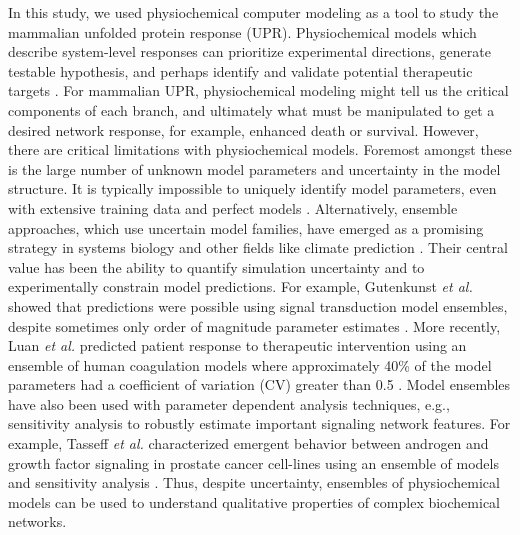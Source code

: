 \documentclass[fleqn,10pt]{wlscirep}
\begin{document}
In this study, we used physiochemical computer modeling as a tool to study the mammalian unfolded protein response (UPR). Physiochemical models which describe system-level responses can prioritize experimental directions, generate testable hypothesis, and perhaps identify and validate potential therapeutic targets \cite{KITANO2007}. For mammalian UPR, physiochemical modeling might tell us the critical components of each branch, and ultimately what must be manipulated to get a desired network response, for example, enhanced death or survival. However, there are critical limitations with physiochemical models. Foremost amongst these is the large number of unknown model parameters and uncertainty in the model structure. It is typically impossible to uniquely identify model parameters, even with extensive training data and perfect models \cite{Gadkar:2005ad}. Alternatively, ensemble approaches, which use uncertain model families, have emerged as a promising strategy in systems biology and other fields like climate prediction \cite{Battogtokh:2002uq,Kuepfer:2007,Brown:2003qy,Palmer:2005,Song:2009uq}. Their central value has been the ability to quantify simulation uncertainty and to experimentally constrain model predictions. For example, Gutenkunst \emph{et al.} showed that predictions were possible using signal transduction model ensembles, despite sometimes only order of magnitude parameter estimates \cite{Gutenkunst:2007oq}. More recently, Luan \emph{et al.} predicted patient response to therapeutic intervention using an ensemble of human coagulation models where approximately 40\% of the model parameters had a coefficient of variation (CV) greater than 0.5 \cite{Luan:2010fc}. Model ensembles have also been used with parameter dependent analysis techniques, e.g., sensitivity analysis to robustly estimate important signaling network features. For example, Tasseff \emph{et al.} characterized emergent behavior between androgen and growth factor signaling in prostate cancer cell-lines using an ensemble of models and sensitivity analysis \cite{Tasseff:2010rq}. Thus, despite uncertainty, ensembles of physiochemical models can be used to understand qualitative properties of complex biochemical networks. 
\end{document}
